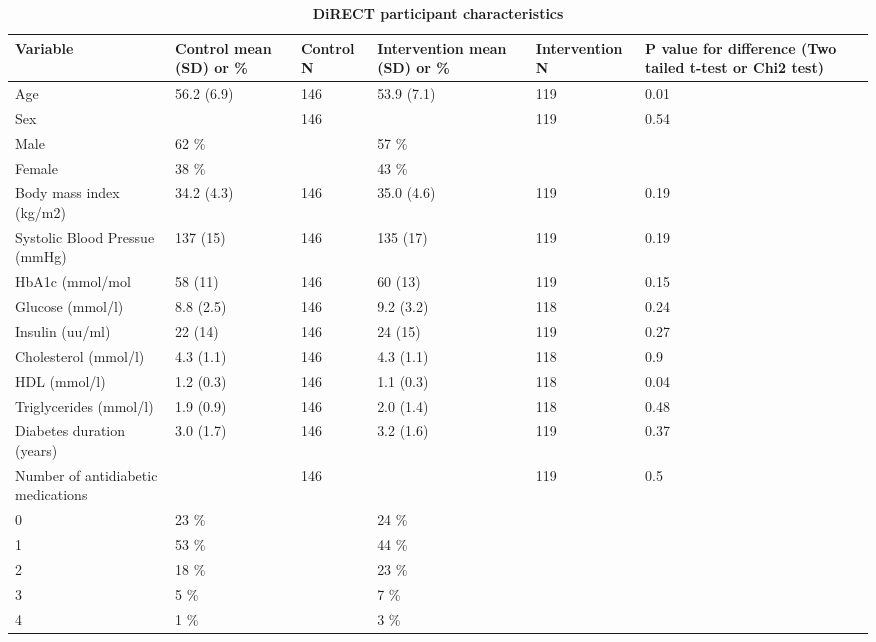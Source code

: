 \documentclass[11pt,twoside]{bristolthesis}
\begin{document}
\begin{landscape}
\begin{table}
\caption[DiRECT participant characteristics]{\label{tab:DiRECT-participants}\textbf{DiRECT participant characteristics}}
\centering
\begin{tabu} to 
\toprule
Variable & Control mean (SD) or \% & Control N & Intervention mean (SD) or \% & Intervention N & P value for difference (Two tailed t-test or Chi2 test)\\
\midrule
Age & 56.2 (6.9) & 146 & 53.9 (7.1) & 119 & 0.01\\
Sex &  & 146 &  & 119 & 0.54\\
\hspace{1em}Male & 62 \% &  & 57 \% &  & \\
\hspace{1em}Female & 38 \% &  & 43 \% &  & \\
Body mass index (kg/m2) & 34.2 (4.3) & 146 & 35.0 (4.6) & 119 & 0.19\\
\addlinespace
Systolic Blood Pressue (mmHg) & 137 (15) & 146 & 135 (17) & 119 & 0.19\\
HbA1c (mmol/mol & 58 (11) & 146 & 60 (13) & 119 & 0.15\\
Glucose (mmol/l) & 8.8 (2.5) & 146 & 9.2 (3.2) & 118 & 0.24\\
Insulin (uu/ml) & 22 (14) & 146 & 24 (15) & 119 & 0.27\\
Cholesterol (mmol/l) & 4.3 (1.1) & 146 & 4.3 (1.1) & 118 & 0.9\\
\addlinespace
HDL (mmol/l) & 1.2 (0.3) & 146 & 1.1 (0.3) & 118 & 0.04\\
Triglycerides (mmol/l) & 1.9 (0.9) & 146 & 2.0 (1.4) & 118 & 0.48\\
Diabetes duration (years) & 3.0 (1.7) & 146 & 3.2 (1.6) & 119 & 0.37\\
Number of antidiabetic medications &  & 146 &  & 119 & 0.5\\
\hspace{1em}0 & 23 \% &  & 24 \% &  & \\
\addlinespace
\hspace{1em}1 & 53 \% &  & 44 \% &  & \\
\hspace{1em}2 & 18 \% &  & 23 \% &  & \\
\hspace{1em}3 & 5 \% &  & 7 \% &  & \\
\hspace{1em}4 & 1 \% &  & 3 \% &  & \\

\end{tabu}
\end{table}
\end{landscape}
\end{document}
